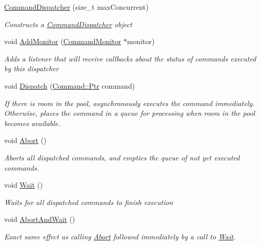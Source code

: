 \begin{DoxyCompactItemize}
\item 
\mbox{\hyperlink{class_command_lib_1_1_command_dispatcher_a9ef89de55c915fbd5f2e61784d67d8a0}{Command\+Dispatcher}} (size\+\_\+t max\+Concurrent)
\begin{DoxyCompactList}\small\item\em Constructs a \mbox{\hyperlink{class_command_lib_1_1_command_dispatcher}{Command\+Dispatcher}} object \end{DoxyCompactList}\item 
void \mbox{\hyperlink{class_command_lib_1_1_command_dispatcher_a2995e97c734165b7d0b3491d606c547b}{Add\+Monitor}} (\mbox{\hyperlink{class_command_lib_1_1_command_monitor}{Command\+Monitor}} $\ast$monitor)
\begin{DoxyCompactList}\small\item\em Adds a listener that will receive callbacks about the status of commands executed by this dispatcher\end{DoxyCompactList}\item 
void \mbox{\hyperlink{class_command_lib_1_1_command_dispatcher_a2a1db45e830c48a4085bb2b86e47c692}{Dispatch}} (\mbox{\hyperlink{class_command_lib_1_1_command_a3b3e4f00144373299df5c6bb1acc319d}{Command\+::\+Ptr}} command)
\begin{DoxyCompactList}\small\item\em If there is room in the pool, asynchronously executes the command immediately. Otherwise, places the command in a queue for processing when room in the pool becomes available. \end{DoxyCompactList}\item 
void \mbox{\hyperlink{class_command_lib_1_1_command_dispatcher_ade1b36f9203de1426d7dff4f83808bec}{Abort}} ()
\begin{DoxyCompactList}\small\item\em Aborts all dispatched commands, and empties the queue of not yet executed commands. \end{DoxyCompactList}\item 
void \mbox{\hyperlink{class_command_lib_1_1_command_dispatcher_ad5f8cae272c637ac628977c1556171c6}{Wait}} ()
\begin{DoxyCompactList}\small\item\em Waits for all dispatched commands to finish execution \end{DoxyCompactList}\item 
void \mbox{\hyperlink{class_command_lib_1_1_command_dispatcher_a324fd9debb368929cbc5357440bd8111}{Abort\+And\+Wait}} ()
\begin{DoxyCompactList}\small\item\em Exact same effect as calling \mbox{\hyperlink{class_command_lib_1_1_command_dispatcher_ade1b36f9203de1426d7dff4f83808bec}{Abort}} followed immediately by a call to \mbox{\hyperlink{class_command_lib_1_1_command_dispatcher_ad5f8cae272c637ac628977c1556171c6}{Wait}}. \end{DoxyCompactList}\end{DoxyCompactItemize}


